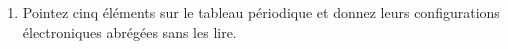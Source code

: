 \begin{enumerate}[\bf 1)]
\item Pointez cinq \'el\'ements sur le tableau p\'eriodique et donnez leurs configurations 
\'electroniques abrégées sans les lire.
\end{enumerate}
%
